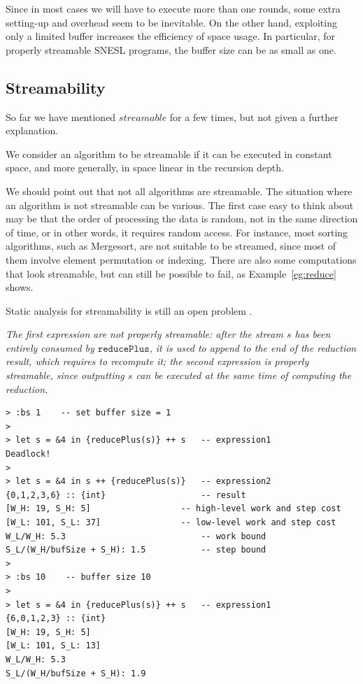 
Since in most cases we will have to execute more than one rounds, some extra setting-up and overhead seem to be inevitable.
On the other hand, exploiting only a limited buffer increases the efficiency of space usage. 
In particular, for properly streamable SNESL programs, the buffer size can be as small as one.


\subsection{Streamability}

So far we have mentioned $streamable$ for a few times, but not given a further explanation.

We consider an algorithm to be streamable if it can be executed in constant space, and more generally, in space linear in the recursion depth.

We should point out that not all algorithms are streamable. 
The situation where an algorithm is not streamable can be various.
The first case easy to think about may be that the order of processing the data is random, not in the same direction of time, or in other words, it requires random access.
For instance, most sorting algorithms, such as Mergesort, are not suitable to be streamed, since most of them involve element permutation or indexing. There are also some computations that look streamable, but can still be possible to fail, as Example~\ref{eg:reduce} shows.

Static analysis for streamability is still an open problem \cite{Fphd}.

\begin{example}\label{eg:reduce}
	\emph{The first expression are not properly streamable: after the stream $s$ has been entirely consumed by $\mathtt{reducePlus}$, it is used to append to the end of the reduction result, which requires to recompute it; the second expression is properly streamable, since outputting $s$ can be executed at the same time of computing the reduction.}
\end{example}
\begin{lstlisting}[style=nesl-style]
> :bs 1    -- set buffer size = 1
>
> let s = &4 in {reducePlus(s)} ++ s   -- expression1
Deadlock!
>
> let s = &4 in s ++ {reducePlus(s)}   -- expression2
{0,1,2,3,6} :: {int}                   -- result
[W_H: 19, S_H: 5]                  -- high-level work and step cost
[W_L: 101, S_L: 37]                -- low-level work and step cost
W_L/W_H: 5.3                           -- work bound
S_L/(W_H/bufSize + S_H): 1.5           -- step bound
>
> :bs 10    -- buffer size 10
>
> let s = &4 in {reducePlus(s)} ++ s   -- expression1 
{6,0,1,2,3} :: {int}
[W_H: 19, S_H: 5]
[W_L: 101, S_L: 13]
W_L/W_H: 5.3
S_L/(W_H/bufSize + S_H): 1.9
\end{lstlisting}


